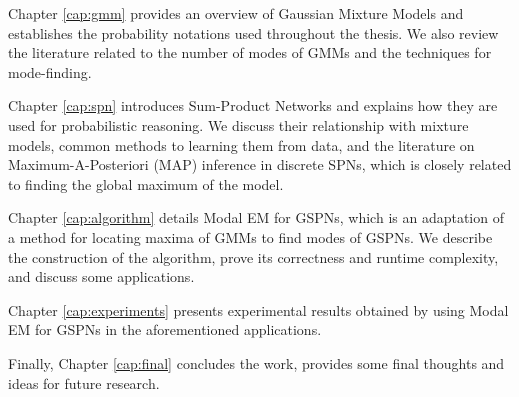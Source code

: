 Chapter \ref{cap:gmm} provides an overview of Gaussian Mixture Models and establishes the probability notations used throughout the thesis. We also review the literature related to the number of modes of GMMs and the techniques for mode-finding.

Chapter \ref{cap:spn} introduces Sum-Product Networks and explains how they are used for probabilistic reasoning. We discuss their relationship with mixture models, common methods to learning them from data, and the literature on Maximum-A-Posteriori (MAP) inference in discrete SPNs, which is closely related to finding the global maximum of the model.

Chapter \ref{cap:algorithm} details Modal EM for GSPNs, which is an adaptation of a method for locating maxima of GMMs to find modes of GSPNs. We describe the construction of the algorithm, prove its correctness and runtime complexity, and discuss some applications.

Chapter \ref{cap:experiments} presents experimental results obtained by using Modal EM for GSPNs in the aforementioned applications.

Finally, Chapter \ref{cap:final} concludes the work, provides some final thoughts and ideas for future research.
